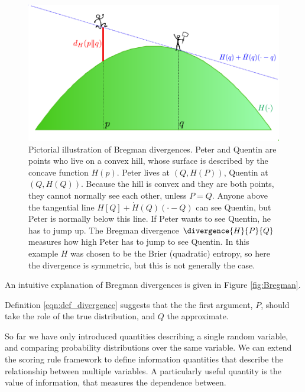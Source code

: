 \begin{figure}
\begin{center}
	\includegraphics[width=0.8\columnwidth]{figs/embeddings/Bregman}
\end{center}
\caption{Pictorial illustration of Bregman divergences. Peter and Quentin are points who live on a convex hill, whose surface is described by the concave function $H(p)$. Peter lives at $(Q,H(P))$, Quentin at $(Q,H(Q))$. Because the hill is convex and they are both points, they cannot normally see each other, unless $P=Q$. Anyone above the tangential line $H[Q] + \dot{H}(Q)(\cdot-Q)$ can see Quentin, but Peter is normally below this line. If Peter wants to see Quentin, he has to jump up. The Bregman divergence $\divergence{H}{P}{Q}$ measures how high Peter has to jump to see Quentin. In this example $H$ was chosen to be the Brier (quadratic) entropy, so here the divergence is symmetric, but this is not generally the case.}
\end{figure}

An intuitive explanation of Bregman divergences is given in Figure \ref{fig:Bregman}.

\citep{Amari2010,Dawid2007}
Definition \eqref{eqn:def_divergence} suggests that the the first argument, $P$, should take the role of the true distribution, and $Q$ the approximate. 

So far we have only introduced quantities describing a single random variable, and comparing probability distributions over the same variable. We can extend the scoring rule framework to define information quantities that describe the relationship between multiple variables. A particularly useful quantity is the value of information, that measures the dependence between.

